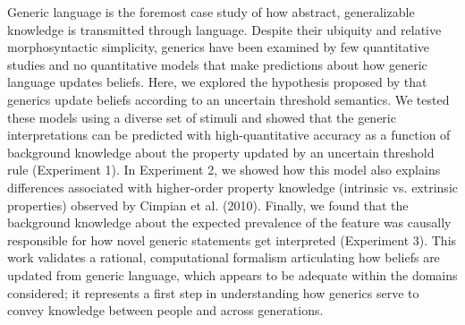 \documentclass[floatsintext,man]{apa6}
\begin{document}
Generic language is the foremost case study of how abstract, generalizable knowledge is transmitted through language.
Despite their ubiquity and relative morphosyntactic simplicity, generics have been examined by few quantitative studies and no quantitative models that make predictions about how generic language updates beliefs.
Here, we explored the hypothesis proposed by  that generics update beliefs according to an uncertain threshold semantics. 
We tested these models using a diverse set of stimuli and showed that the generic interpretations can be predicted with high-quantitative accuracy as a function of background knowledge about the property updated by an uncertain threshold rule (Experiment 1).
In Experiment 2, we showed how this model also explains differences associated with higher-order property knowledge (intrinsic vs. extrinsic properties) observed by Cimpian et al. (2010).
Finally, we found that the background knowledge about the expected prevalence of the feature was causally responsible for how novel generic statements get interpreted (Experiment 3).
This work validates a rational, computational formalism articulating how beliefs are updated from generic language, which appears to be adequate within the domains considered; it represents a first step in understanding how generics serve to convey knowledge between people and across generations.
\end{document}
